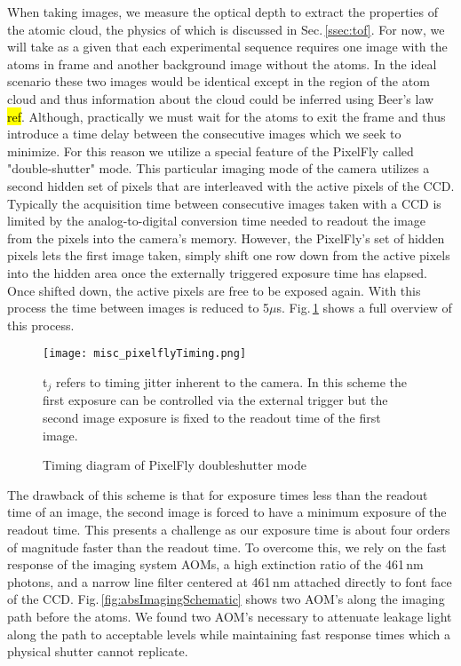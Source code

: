 When taking images, we measure the optical depth to extract the properties of the atomic cloud, the physics of which is discussed in Sec.\,\ref{ssec:tof}.
For now, we will take as a given that each experimental sequence requires one image with the atoms in frame and another background image without the atoms.
In the ideal scenario these two images would be identical except in the region of the atom cloud and thus information about the cloud could be inferred using Beer's law \hl{ref}.
Although, practically we must wait for the atoms to exit the frame and thus introduce a time delay between the consecutive images which we seek to minimize.
For this reason we utilize a special feature of the PixelFly called "double-shutter" mode.
This particular imaging mode of the camera utilizes a second hidden set of pixels that are interleaved with the active pixels of the CCD.
Typically the acquisition time between consecutive images taken with a CCD is limited by the analog-to-digital conversion time needed to readout the image from the pixels into the camera's memory.
However, the PixelFly's set of hidden pixels lets the first image taken, simply shift one row down from the active pixels into the hidden area once the externally triggered exposure time has elapsed.
Once shifted down, the active pixels are free to be exposed again.
With this process the time between images is reduced to 5$\mu$s.
Fig.\,\ref{fig:pixelflyTiming} shows a full overview of this process.
	\begin{figure} 
		\centerline{
		\texttt{[image: misc\_pixelflyTiming.png]}}
		\caption{Timing diagram of PixelFly doubleshutter mode}{t$_j$ refers to timing jitter inherent to the camera. In this scheme the first exposure can be controlled via the external trigger but the second image exposure is fixed to the readout time of the first image.}
		\label{fig:pixelflyTiming}
	\end{figure}
The drawback of this scheme is that for exposure times less than the readout time of an image, the second image is forced to have a minimum exposure of the readout time.
This presents a challenge as our exposure time is about four orders of magnitude faster than the readout time.
To overcome this, we rely on the fast response of the imaging system AOMs, a high extinction ratio of the 461\,nm photons, and a narrow line filter centered at 461\,nm attached directly to font face of the CCD.
Fig.\,\ref{fig:absImagingSchematic} shows two AOM's along the imaging path before the atoms.
We found two AOM's necessary to attenuate leakage light along the path to acceptable levels while maintaining fast response times which a physical shutter cannot replicate.

